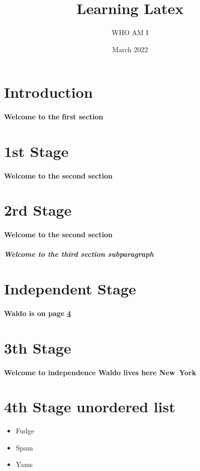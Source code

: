 \documentclass[12pt,letterpaper,titlepage]{article}
\title{Learning Latex}
\author{WHO AM I}
\date{March 2022}
\newcommand{\currentState}{New\ York} %
\begin{document}
        \maketitle
        \tableofcontents
        \clearpage
        \section{Introduction} 
            \paragraph{Welcome to the first section}
        \section{1st Stage}
            \paragraph{Welcome to the second section}
        \section[Alias of 2rd Stage]{2rd Stage}
            \paragraph{Welcome to the second section}
                \subparagraph{Welcome to the third section subparagraph}
        \section*{Independent Stage} %
            \paragraph{\bf Waldo is on page \ref{waldoReF}} 
        \section[Alias of 3th Stage]{3th Stage} 
            \label{waldoReF}
            \paragraph{\bf Welcome to independence Waldo lives here \currentState }
        \section {4th Stage unordered list} 
            \begin{itemize}
                \item Fudge
                \item Spam
                \item Yams
            \end{itemize}
\end{document}

